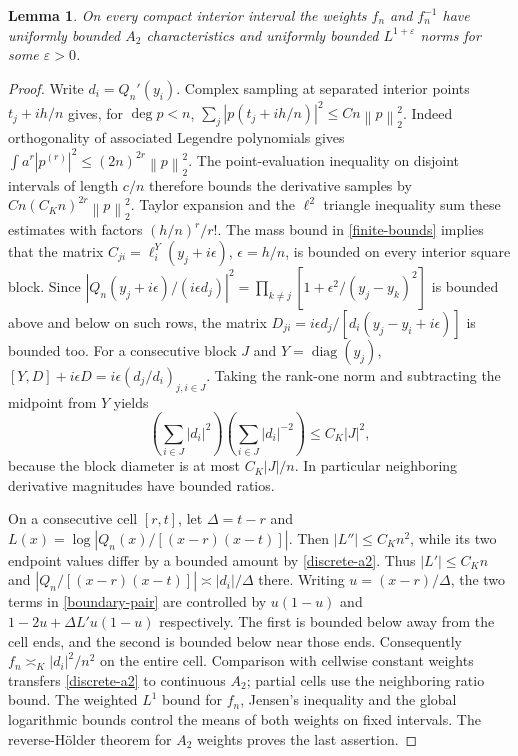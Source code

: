 \documentclass[a4paper,11pt]{amsart}
\newtheorem{lemma}[theorem]{Lemma}
\theoremstyle{remark}\newtheorem{remark}[theorem]{Remark}
\newcommand{\diag}{\operatorname{diag}}
\newcommand{\norm}[1]{\left\lVert#1\right\rVert}
\begin{document}
\begin{lemma}\label{local-a2}
On every compact interior interval the weights $f_n$ and $f_n^{-1}$
have uniformly bounded $A_2$ characteristics and uniformly bounded
$L^{1+\varepsilon}$ norms for some $\varepsilon>0$.
\end{lemma}

\begin{proof}
Write $d_i=Q_n'(y_i)$. Complex sampling at separated interior points
$t_j+ih/n$ gives, for $\deg p<n$,
$\sum_j|p(t_j+ih/n)|^2\le Cn\norm p_2^2$.
Indeed orthogonality of associated Legendre polynomials gives
$\int a^r|p^{(r)}|^2\le(2n)^{2r}\norm p_2^2$.
The point-evaluation inequality on disjoint intervals of length $c/n$
therefore bounds the derivative samples by
$Cn(C_Kn)^{2r}\norm p_2^2$. Taylor expansion and the $\ell^2$
triangle inequality sum these estimates with factors $(h/n)^r/r!$.
The mass bound in \eqref{finite-bounds} implies that the matrix
$C_{ji}=\ell_i^Y(y_j+i\epsilon)$, $\epsilon=h/n$, is bounded on
every interior square block. Since
$|Q_n(y_j+i\epsilon)/(i\epsilon d_j)|^2
 =\prod_{k\ne j}[1+\epsilon^2/(y_j-y_k)^2]$
is bounded above and below on such rows, the matrix
$D_{ji}=i\epsilon d_j/[d_i(y_j-y_i+i\epsilon)]$ is bounded too.
For a consecutive block $J$ and $Y=\diag(y_j)$,
$[Y,D]+i\epsilon D=i\epsilon(d_j/d_i)_{j,i\in J}$.
Taking the rank-one norm and subtracting the midpoint from $Y$ yields
\begin{equation}\label{discrete-a2}
 \left(\sum_{i\in J}|d_i|^2\right)
 \left(\sum_{i\in J}|d_i|^{-2}\right)\le C_K|J|^2,
\end{equation}
because the block diameter is at most $C_K|J|/n$.
In particular neighboring derivative magnitudes have bounded ratios.

On a consecutive cell $[r,t]$, let $\Delta=t-r$ and
$L(x)=\log|Q_n(x)/[(x-r)(x-t)]|$.
Then $|L''|\le C_Kn^2$, while its two endpoint values differ by a
bounded amount by \eqref{discrete-a2}. Thus $|L'|\le C_Kn$ and
$|Q_n/[(x-r)(x-t)]|\asymp |d_i|/\Delta$ there.
Writing $u=(x-r)/\Delta$, the two terms in \eqref{boundary-pair}
are controlled by $u(1-u)$ and
$1-2u+\Delta L'u(1-u)$ respectively. The first is bounded below
away from the cell ends, and the second is bounded below near those
ends. Consequently $f_n\asymp_K |d_i|^2/n^2$ on the entire cell.
Comparison with cellwise constant weights transfers
\eqref{discrete-a2} to continuous $A_2$; partial cells use the
neighboring ratio bound. The weighted $L^1$ bound for $f_n$, Jensen's
inequality and the global logarithmic bounds control the means of
both weights on fixed intervals. The reverse-H\"older theorem for
$A_2$ weights \cite{gcrf} proves the last assertion.
\end{proof}
\end{document}
